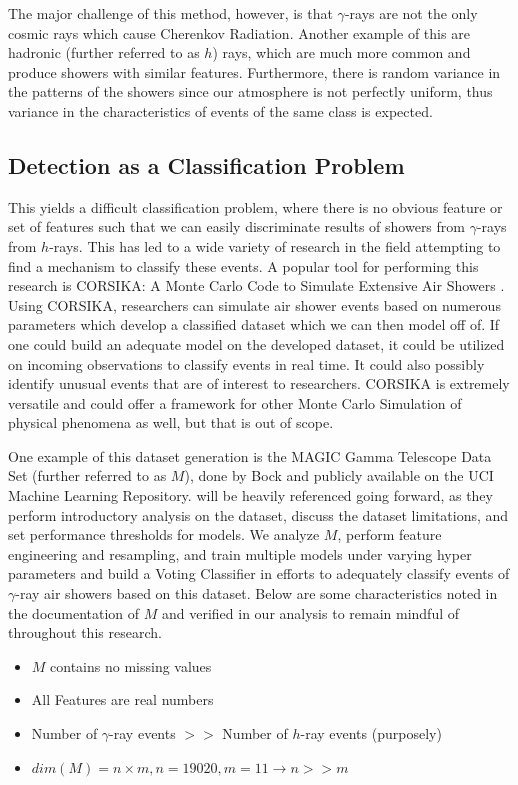 \documentclass[12pt, a4paper]{article} %
\begin{document}
The major challenge of this method, however, is that $\gamma$-rays are not the only cosmic rays which cause Cherenkov Radiation. Another example of this are hadronic (further referred to as $h$) rays, which are much more common and produce showers with similar features. Furthermore, there is random variance in the patterns of the showers since our atmosphere is not perfectly uniform, thus variance in the characteristics of events of the same class is expected. 

\subsection{Detection as a Classification Problem}

This yields a difficult classification problem, where there is no obvious feature or set of features such that we can easily discriminate results of showers from $\gamma$-rays from $h$-rays. This has led to a wide variety of research in the field attempting to find a mechanism to classify these events. A popular tool for performing this research is CORSIKA: A Monte Carlo Code to Simulate Extensive Air Showers \citep{DataProd}. Using CORSIKA, researchers can simulate air shower events based on numerous parameters which develop a classified dataset which we can then model off of. If one could build an adequate model on the developed dataset, it could be utilized on incoming observations to classify events in real time. It could also possibly identify unusual events that are of interest to researchers. CORSIKA is extremely versatile and could offer a framework for other Monte Carlo Simulation of physical phenomena as well, but that is out of scope. 


One example of this dataset generation is the MAGIC Gamma Telescope Data Set (further referred to as $M$), done by Bock \citep{CaseStudy} and publicly available on the UCI Machine Learning Repository. \cite{CaseStudy} will be heavily referenced going forward, as they perform introductory analysis on the dataset, discuss the dataset limitations, and set performance thresholds for models. We analyze $M$, perform feature engineering and resampling, and train multiple models under varying hyper parameters and build a Voting Classifier in efforts to adequately classify events of $\gamma$-ray air showers based on this dataset. Below are some characteristics noted in the documentation of $M$ and verified in our analysis to remain mindful of throughout this research. 

\begin{itemize}
	\item $M$ contains no missing values
	\item All Features are real numbers
	\item Number of $\gamma$-ray events $>>$ Number of $h$-ray events (purposely)
	\item $dim \left( M \right) = n \times m, n=19020, m=11 \rightarrow n>>m$
\end{itemize}
\end{document}

